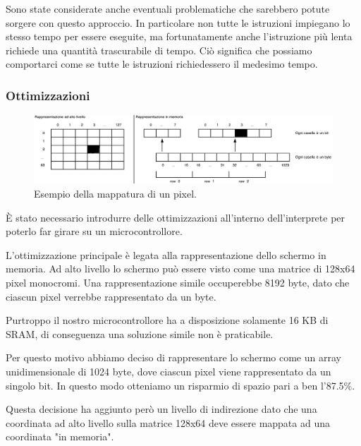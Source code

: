 \documentclass[a4paper]{article}
\begin{document}
Sono state considerate anche eventuali problematiche che sarebbero potute sorgere con questo
approccio. In particolare non tutte le istruzioni impiegano lo stesso tempo per essere eseguite,
ma fortunatamente anche l'istruzione più lenta richiede una quantità trascurabile di tempo.
Ciò significa che possiamo comportarci come se tutte le istruzioni richiedessero il medesimo tempo.

\subsubsection{Ottimizzazioni}

\begin{figure}[h!t]
    \begin{center}
        \includegraphics[scale=0.38]{figures/screenopt_small.pdf}
    \end{center}
    \caption{Esempio della mappatura di un pixel.}
    \label{fig:screenopt}
\end{figure}

È stato necessario introdurre delle ottimizzazioni all'interno
dell'interprete per poterlo far girare su un microcontrollore.

L'ottimizzazione principale è legata alla rappresentazione dello
schermo in memoria. Ad alto livello lo schermo può essere visto
come una matrice di 128x64 pixel monocromi. Una rappresentazione
simile occuperebbe 8192 byte, dato che ciascun pixel verrebbe
rappresentato da un byte.

Purtroppo il nostro microcontrollore ha a disposizione solamente 16 KB di SRAM, di conseguenza
una soluzione simile non è praticabile.

Per questo motivo abbiamo deciso di rappresentare lo schermo come un array unidimensionale di
1024 byte, dove ciascun pixel viene rappresentato da un singolo bit. In questo modo otteniamo
un risparmio di spazio pari a ben l'87.5\%.

Questa decisione ha aggiunto però un livello di indirezione dato
che una coordinata ad alto livello sulla matrice 128x64 deve essere
mappata ad una coordinata "in memoria".
\end{document}
